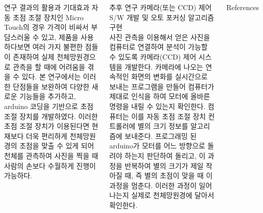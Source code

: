 \documentclass{gshs_poster_beamer}
\begin{document}
\begin{columns}[T]
\begin{posterbox}[colbacktitle=purple,coltitle=white,colback=purple!5]{연구 결과의 활용과 기대효과}
자동 초점 조절 장치인 Micro Touch의 경우 가격이 비싸서 부담스러울 수 있고, 제품을 사용하다보면 여러 가지 불편한 점들이 존재하여 실제 천체망원경으로 관측을 할 때에 어려움을 겪을 수 있다. 본 연구에서는 이러한 단점들을 보완하여 다양한 새로운 기능들을 추가하고, arduino 코딩을 기반으로 초점 조절 장치를 개발하였다. 이러한 초점 조절 장치가 이용된다면 현재보다 더욱 편리하게 천체망원경의 초점을 맞출 수 있게 되어 천체를 관측하여 사진을 찍을 때 사람의 손보다 수월하게 진행이 가능하다.
\end{posterbox}

\vspace{1em}

\begin{posterbox}[colbacktitle=brown,coltitle=white,colback=brown!5]{추후 연구}
	카메라(또는 CCD) 제어 S/W 개발 및 오토 포커싱 알고리즘 구현\\
	사진 관측을 이용해서 얻은 사진을 컴퓨터로 연결하여 분석이 가능할 수 있도록 카메라(CCD) 제어 시스템을 개발한다. 카메라에 나오는 연속적인 화면의 변화를 실시간으로 보내는 프로그램을 만들어 컴퓨터가 제대로 인식을 하여 모터에 올바른 명령을 내릴 수 있는지 확인한다. 컴퓨터는 이를 자동 초점 조절 장치 컨트롤러에 별의 크기 정보를 알고리즘에 보내준다. 프로그래밍 된 arduino가 모터를 어느 방향으로 돌려야 하는지 판단하여 돌리고, 이 과정을 반복하여 별의 크기가 제일 작아질 때, 즉 별의 초점이 맞을 때 이 과정을 멈춘다. 이러한 과정이 일어나는지 실제로 천체망원경에 달아서 확인한다.
\end{posterbox}

\vspace{1em}

\begin{posterbox}[colbacktitle=yellow,coltitle=black,colback=yellow!5]{References}
	

\end{posterbox}



\end{columns}
\end{document}
